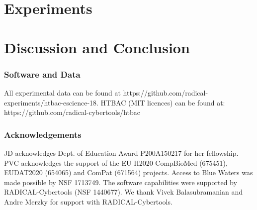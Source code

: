 \documentclass[conference]{IEEEtran}
\begin{document}
\section{Experiments}\label{sec:experiments}



\section{Discussion and Conclusion}\label{sec:discussion}


\subsubsection*{Software and Data}

{\footnotesize All experimental data can be found at 
https://github.com/radical-experiments/htbac-escience-18. HTBAC (MIT licences) 
can be found at: https://github.com/radical-cybertools/htbac}

\subsubsection*{Acknowledgements}
%

{\footnotesize JD acknowledges Dept. of Education Award P200A150217 for her
fellowship. PVC acknowledges the support of the EU H2020 CompBioMed (675451),
EUDAT2020 (654065) and ComPat (671564) projects. Access to Blue Waters was
made possible by NSF 1713749. The software capabilities were supported by
RADICAL-Cybertools (NSF 1440677). We thank Vivek Balasubramanian and Andre
Merzky for support with RADICAL-Cybertools.}

\newpage



\end{document}
